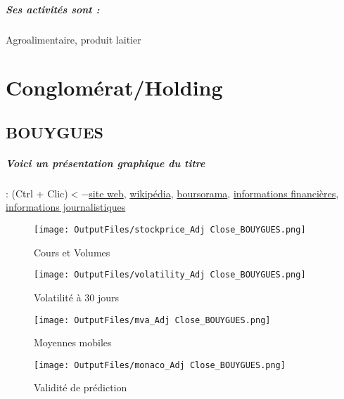 \documentclass[11pt,a4paper]{report}%
\begin{document}
\paragraph{Ses activités sont : } Agroalimentaire, produit laitier 
    
    \newpage\chapter{Conglomérat/Holding}


\section{BOUYGUES}

\paragraph{Voici un présentation graphique du titre} : (Ctrl + Clic)$<-$\href{https://www.bouygues.com/finance/investisseurs/lessentiel-investisseur/}{site web}, \href{https://fr.wikipedia.org/wiki/Bouygues}{wikipédia}, \href{https://www.boursorama.com/cours/1rPEN}{boursorama}, \href{https://www.qwant.com/?q=site:https:%2f%2fwww.easybourse.com%2faction-societe%2fBOUYGUES&t=web&client=ext-firefox-hp}{informations financières}, \href{https://bourse.lerevenu.com/cours-de-bourse/fiche-valeur-synthese/BOUYGUES/EN-FR}{informations journalistiques}
\begin{figure}[!htb]
   \begin{minipage}{0.5\textwidth}
     \centering
     \texttt{[image: OutputFiles/stockprice\_Adj Close\_BOUYGUES.png]}
     \caption{Cours et Volumes}\label{Fig:price_BOUYGUES}
   \end{minipage}\hfill
   \begin{minipage}{0.5\textwidth}
     \centering
     \texttt{[image: OutputFiles/volatility\_Adj Close\_BOUYGUES.png]}
     \caption{Volatilité à 30 jours}\label{Fig:volat_BOUYGUES}
   \end{minipage}
\end{figure}
\begin{figure}[!htb]
   \begin{minipage}{0.5\textwidth}
     \centering
     \texttt{[image: OutputFiles/mva\_Adj Close\_BOUYGUES.png]}
     \caption{Moyennes mobiles}\label{Fig:mva_BOUYGUES}
   \end{minipage}\hfill
   \begin{minipage}{0.5\textwidth}
     \centering
     \texttt{[image: OutputFiles/monaco\_Adj Close\_BOUYGUES.png]}
     \caption{Validité de prédiction}\label{Fig:prediction_BOUYGUES}
   \end{minipage}
\end{figure}
\end{document}
